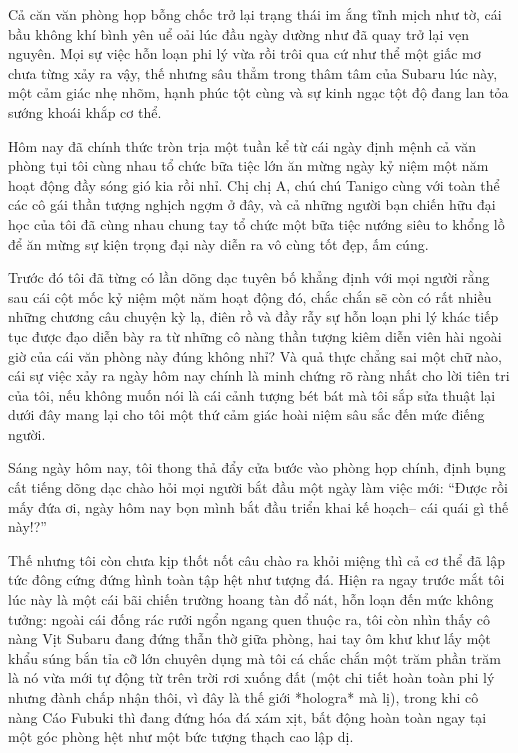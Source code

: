 \documentclass[../main.tex]{subfiles}
\begin{document}
Cả căn văn phòng họp bỗng chốc trở lại trạng thái im ắng tĩnh mịch như tờ, cái bầu không khí bình yên uể oải lúc đầu ngày dường như đã quay trở lại vẹn nguyên. Mọi sự việc hỗn loạn phi lý vừa rồi trôi qua cứ như thể một giấc mơ chưa từng xảy ra vậy, thế nhưng sâu thẳm trong thâm tâm của Subaru lúc này, một cảm giác nhẹ nhõm, hạnh phúc tột cùng và sự kinh ngạc tột độ đang lan tỏa sướng khoái khắp cơ thể.

\omk
{}

Hôm nay đã chính thức tròn trịa một tuần kể từ cái ngày định mệnh cả văn phòng tụi tôi cùng nhau tổ chức bữa tiệc lớn ăn mừng ngày kỷ niệm một năm hoạt động đầy sóng gió kia rồi nhỉ. Chị chị A, chú chú Tanigo cùng với toàn thể các cô gái thần tượng nghịch ngợm ở đây, và cả những người bạn chiến hữu đại học của tôi đã cùng nhau chung tay tổ chức một bữa tiệc nướng siêu to khổng lồ để ăn mừng sự kiện trọng đại này diễn ra vô cùng tốt đẹp, ấm cúng.

Trước đó tôi đã từng có lần dõng dạc tuyên bố khẳng định với mọi người rằng sau cái cột mốc kỷ niệm một năm hoạt động đó, chắc chắn sẽ còn có rất nhiều những chương câu chuyện kỳ lạ, điên rồ và đầy rẫy sự hỗn loạn phi lý khác tiếp tục được đạo diễn bày ra từ những cô nàng thần tượng kiêm diễn viên hài ngoài giờ của cái văn phòng này đúng không nhỉ? Và quả thực chẳng sai một chữ nào, cái sự việc xảy ra ngày hôm nay chính là minh chứng rõ ràng nhất cho lời tiên tri của tôi, nếu không muốn nói là cái cảnh tượng bét bát mà tôi sắp sửa thuật lại dưới đây mang lại cho tôi một thứ cảm giác hoài niệm sâu sắc đến mức điếng người.

Sáng ngày hôm nay, tôi thong thả đẩy cửa bước vào phòng họp chính, định bụng cất tiếng dõng dạc chào hỏi mọi người bắt đầu một ngày làm việc mới: ``Được rồi mấy đứa ơi, ngày hôm nay bọn mình bắt đầu triển khai kế hoạch-- cái quái gì thế này!?''

Thế nhưng tôi còn chưa kịp thốt nốt câu chào ra khỏi miệng thì cả cơ thể đã lập tức đông cứng đứng hình toàn tập hệt như tượng đá. Hiện ra ngay trước mắt tôi lúc này là một cái bãi chiến trường hoang tàn đổ nát, hỗn loạn đến mức không tưởng: ngoài cái đống rác rưởi ngổn ngang quen thuộc ra, tôi còn nhìn thấy cô nàng Vịt Subaru đang đứng thẫn thờ giữa phòng, hai tay ôm khư khư lấy một khẩu súng bắn tỉa cỡ lớn chuyên dụng mà tôi cá chắc chắn một trăm phần trăm là nó vừa mới tự động từ trên trời rơi xuống đất (một chi tiết hoàn toàn phi lý nhưng đành chấp nhận thôi, vì đây là thế giới *hologra* mà lị), trong khi cô nàng Cáo Fubuki thì đang đứng hóa đá xám xịt, bất động hoàn toàn ngay tại một góc phòng hệt như một bức tượng thạch cao lập dị.
\end{document}
